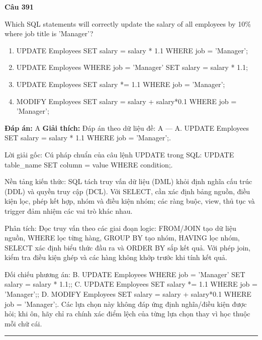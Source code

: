 \documentclass[11pt,a4paper]{article}
\newenvironment{question}[1]{%
  \par\vspace{1em}\noindent\textbf{\large Câu #1}\par\vspace{0.4em}
}{%
  \par\vspace{1em}\hrule\vspace{0.6em}
}
\newenvironment{choices}{%
  \begin{enumerate}[label=\textbf{\Alph*.},leftmargin=2.2em,itemsep=2pt,topsep=3pt]
}{%
  \end{enumerate}
}
\newcommand{\choice}{\item}
\begin{document}
\begin{question}{391}
Which SQL statements will correctly update the salary of all employees by 10\% where job title is 'Manager'?
\begin{choices}
\choice UPDATE Employees SET salary = salary * 1.1 WHERE job = 'Manager';
\choice UPDATE Employees WHERE job = 'Manager' SET salary = salary * 1.1;
\choice UPDATE Employees SET salary *= 1.1 WHERE job = 'Manager';
\choice MODIFY Employees SET salary = salary + salary*0.1 WHERE job = 'Manager';
\end{choices}
\textbf{Đáp án:} A
\textbf{Giải thích:} Đáp án theo dữ liệu đề: A — A. UPDATE Employees SET salary = salary * 1.1 WHERE job = 'Manager';.

Lời giải gốc: Cú pháp chuẩn của câu lệnh UPDATE trong SQL: UPDATE table_name SET column = value WHERE condition;.

Nền tảng kiến thức: SQL tách truy vấn dữ liệu (DML) khỏi định nghĩa cấu trúc (DDL) và quyền truy cập (DCL). Với SELECT, cần xác định bảng nguồn, điều kiện lọc, phép kết hợp, nhóm và điều kiện nhóm; các ràng buộc, view, thủ tục và trigger đảm nhiệm các vai trò khác nhau.

Phân tích: Đọc truy vấn theo các giai đoạn logic: FROM/JOIN tạo dữ liệu nguồn, WHERE lọc từng hàng, GROUP BY tạo nhóm, HAVING lọc nhóm, SELECT xác định biểu thức đầu ra và ORDER BY sắp kết quả. Với phép join, kiểm tra điều kiện ghép và các hàng không khớp trước khi tính kết quả.

Đối chiếu phương án: B. UPDATE Employees WHERE job = 'Manager' SET salary = salary * 1.1;; C. UPDATE Employees SET salary *= 1.1 WHERE job = 'Manager';; D. MODIFY Employees SET salary = salary + salary*0.1 WHERE job = 'Manager';. Các lựa chọn này không đáp ứng định nghĩa/điều kiện được hỏi; khi ôn, hãy chỉ ra chính xác điểm lệch của từng lựa chọn thay vì học thuộc mỗi chữ cái.
\end{question}
\end{document}
